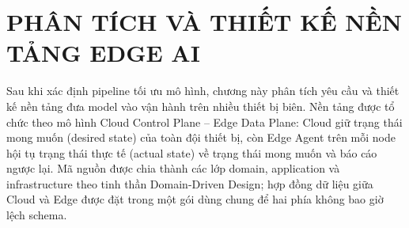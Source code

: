\chapter{PHÂN TÍCH VÀ THIẾT KẾ NỀN TẢNG EDGE AI}

Sau khi xác định pipeline tối ưu mô hình, chương này phân tích yêu cầu và thiết
kế nền tảng đưa model vào vận hành trên nhiều thiết bị biên. Nền tảng được tổ
chức theo mô hình Cloud Control Plane -- Edge Data Plane: Cloud giữ trạng thái
mong muốn (desired state) của toàn đội thiết bị, còn Edge Agent trên mỗi node
hội tụ trạng thái thực tế (actual state) về trạng thái mong muốn và báo cáo ngược
lại. Mã nguồn được chia thành các lớp domain, application và infrastructure theo
tinh thần Domain-Driven Design; hợp đồng dữ liệu giữa Cloud và Edge được đặt
trong một gói dùng chung để hai phía không bao giờ lệch schema.











